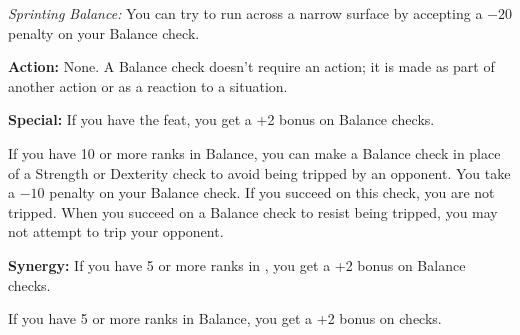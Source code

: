 \textit{Sprinting Balance:} You can try to run across a narrow surface by accepting a $-20$ penalty on your Balance check.

\textbf{Action:} None. A Balance check doesn't require an action; it is made as part of another action or as a reaction to a situation.

\textbf{Special:} If you have the  feat, you get a +2 bonus on Balance checks.

If you have 10 or more ranks in Balance, you can make a Balance check in place of a Strength or Dexterity check to avoid being tripped by an opponent. You take a $-10$ penalty on your Balance check. If you succeed on this check, you are not tripped. When you succeed on a Balance check to resist being tripped, you may not attempt to trip your opponent.

\textbf{Synergy:} If you have 5 or more ranks in , you get a +2 bonus on Balance checks.

If you have 5 or more ranks in Balance, you get a +2 bonus on  checks.